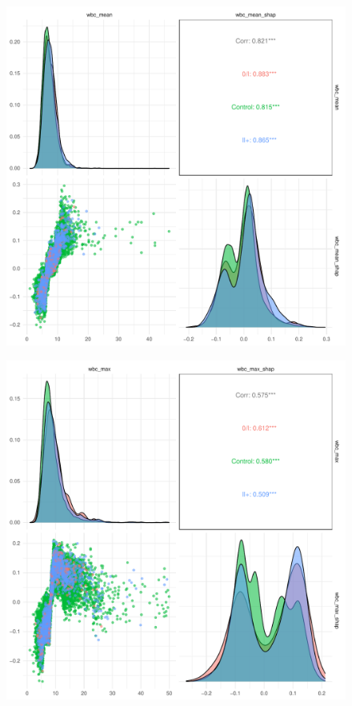 \documentclass[12pt]{article}
\begin{document}
\begin{figure}[h]
\centering
\includegraphics[width=\textwidth]{figures/diagnosing/wbc_mean.pdf}
\end{figure}
\begin{figure}[h]
\centering
\includegraphics[width=\textwidth]{figures/diagnosing/wbc_max.pdf}
\end{figure}
\end{document}
